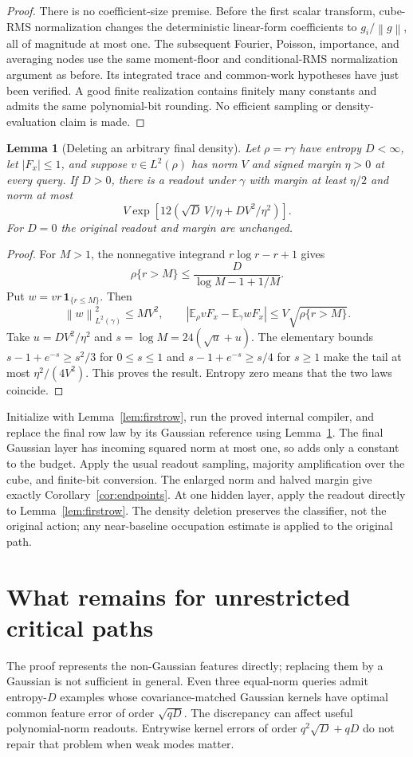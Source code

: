 \documentclass[11pt]{article}
\newtheorem{lemma}[theorem]{Lemma}
\newcommand{\E}{\mathbb E}
\newcommand{\norm}[1]{\left\lVert #1\right\rVert}
\begin{document}
\begin{proof}
There is no coefficient-size premise. Before the first scalar transform, cube-RMS normalization changes the deterministic linear-form coefficients to $g_i/\norm g$, all of magnitude at most one. The subsequent Fourier, Poisson, importance, and averaging nodes use the same moment-floor and conditional-RMS normalization argument as before. Its integrated trace and common-work hypotheses have just been verified. A good finite realization contains finitely many constants and admits the same polynomial-bit rounding. No efficient sampling or density-evaluation claim is made.
\end{proof}

\begin{lemma}[Deleting an arbitrary final density]
\label{lem:lastrow}
Let $\rho=r\gamma$ have entropy $D<\infty$, let $|F_x|\le1$, and suppose $v\in L^2(\rho)$ has norm $V$ and signed margin $\eta>0$ at every query. If $D>0$, there is a readout under $\gamma$ with margin at least $\eta/2$ and norm at most
\[
 V\exp\left[12\left(\sqrt D\,V/\eta+D V^2/\eta^2\right)\right].
\]
For $D=0$ the original readout and margin are unchanged.
\end{lemma}
\begin{proof}
For $M>1$, the nonnegative integrand $r\log r-r+1$ gives
\[
 \rho\{r>M\}\le\frac D{\log M-1+1/M}.
\]
Put $w=vr\,\mathbf1_{\{r\le M\}}$. Then
\[
 \norm w_{L^2(\gamma)}^2\le MV^2,\qquad
 |\E_\rho vF_x-\E_\gamma wF_x|
 \le V\sqrt{\rho\{r>M\}}.
\]
Take $u=DV^2/\eta^2$ and $s=\log M=24(\sqrt u+u)$. The elementary bounds
$s-1+e^{-s}\ge s^2/3$ for $0\le s\le1$ and
$s-1+e^{-s}\ge s/4$ for $s\ge1$ make the tail at most $\eta^2/(4V^2)$. This proves the result. Entropy zero means that the two laws coincide.
\end{proof}

Initialize with Lemma~\ref{lem:firstrow}, run the proved internal compiler, and replace the final row law by its Gaussian reference using Lemma~\ref{lem:lastrow}. The final Gaussian layer has incoming squared norm at most one, so adds only a constant to the budget. Apply the usual readout sampling, majority amplification over the cube, and finite-bit conversion. The enlarged norm and halved margin give exactly Corollary~\ref{cor:endpoints}. At one hidden layer, apply the readout directly to Lemma~\ref{lem:firstrow}. The density deletion preserves the classifier, not the original action; any near-baseline occupation estimate is applied to the original path.

\section{What remains for unrestricted critical paths}
The proof represents the non-Gaussian features directly; replacing them by a Gaussian is not sufficient in general. Even three equal-norm queries admit entropy-$D$ examples whose covariance-matched Gaussian kernels have optimal common feature error of order $\sqrt{qD}$. The discrepancy can affect useful polynomial-norm readouts. Entrywise kernel errors of order $q^2\sqrt D+qD$ do not repair that problem when weak modes matter.
\end{document}
